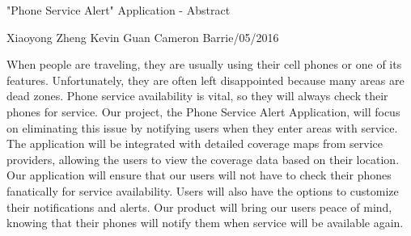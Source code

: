 \documentclass[letterpaper,10pt]{article}
\begin{document}
\begin{center}
\Large{"Phone Service Alert" Application - Abstract}
\end{center}
\begin{flushright}
Xiaoyong Zheng\linebreak
Kevin Guan\linebreak
Cameron Barrie/05/2016
\end{flushright}
\begin{flushleft}
\indent
When people are traveling, they are usually using their cell phones or one of its features. 
Unfortunately, they are often left disappointed because many areas are dead zones.
  Phone service availability is vital, so they will always check their phones for service.
  Our project, the Phone Service Alert Application, will focus on eliminating this issue by notifying 
  users when they enter areas with service. The application will be integrated with detailed coverage 
  maps from service providers, allowing the users to view the coverage data based on their location. 
  Our application will ensure that our users will not have to check their phones fanatically for 
  service availability. Users will also have the options to customize their notifications and alerts. 
  Our product will bring our users peace of mind, knowing that their phones will notify them when 
  service will be available again. 
\end{flushleft}
\end{document}
